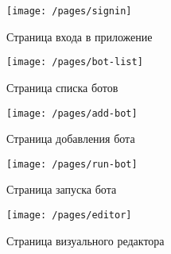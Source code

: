{

\newcommand{\scale}{0.95}

\begin{figure}[H]
	\centering
	\vspace{\toppaddingoffigure}
	\texttt{[image: /pages/signin]}
	\caption{Страница входа в приложение}
	\label{f:signin-page}
\end{figure}


\begin{figure}[H]
	\centering
	\texttt{[image: /pages/bot-list]}
	\caption{Страница списка ботов}
	\label{f:bot-list-page}
\end{figure}

\begin{figure}[H]
	\centering
	\texttt{[image: /pages/add-bot]}
	\caption{Страница добавления бота}
	\label{f:add-bot-page}
\end{figure}

\begin{figure}[H]
	\centering
	\texttt{[image: /pages/run-bot]}
	\caption{Страница запуска бота}
	\label{f:run-bot-page}
\end{figure}


\begin{figure}[H]
	\centering
	\texttt{[image: /pages/editor]}
	\caption{Страница визуального редактора}
	\label{f:editor-page}
\end{figure}

}
